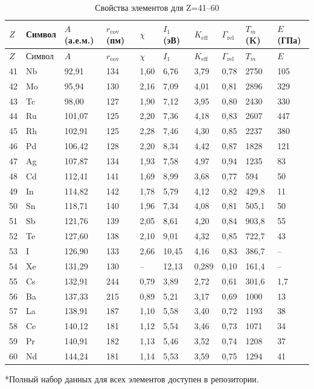 \documentclass[12pt,a4paper]{article}
\newcommand{\Keff}{K_{\mathrm{eff}}}
\begin{document}
	\begin{longtable}{p{0.6cm}p{1.2cm}p{1.2cm}p{1.2cm}p{1.2cm}p{1.2cm}p{1.5cm}p{1.2cm}p{1.2cm}p{1.2cm}}
		\caption{Свойства элементов для Z=41–60} \label{tab:elem-data-41to60} \\
		\toprule
		\(Z\) & Символ & \(A\) (а.е.м.) & \(r_{\text{cov}}\) (пм) & \(\chi\) & \(I_1\) (эВ) & \(\Keff\) & \(\Gamma_{\text{rel}}\) & \(T_m\) (K) & \(E\) (ГПа) \\
		\midrule
		\endfirsthead
		\toprule
		\(Z\) & Символ & \(A\) & \(r_{\text{cov}}\) & \(\chi\) & \(I_1\) & \(\Keff\) & \(\Gamma_{\text{rel}}\) & \(T_m\) & \(E\) \\
		\midrule
		\endhead
		41 & Nb & 92,91 & 134 & 1,60 & 6,76 & 3,79 & 0,78 & 2750 & 105 \\
		42 & Mo & 95,94 & 130 & 2,16 & 7,09 & 4,01 & 0,81 & 2896 & 329 \\
		43 & Tc & 98,00 & 127 & 1,90 & 7,12 & 3,95 & 0,80 & 2430 & 330 \\
		44 & Ru & 101,07 & 125 & 2,20 & 7,36 & 4,18 & 0,83 & 2607 & 447 \\
		45 & Rh & 102,91 & 125 & 2,28 & 7,46 & 4,30 & 0,85 & 2237 & 380 \\
		46 & Pd & 106,42 & 128 & 2,20 & 8,34 & 4,42 & 0,87 & 1828 & 121 \\
		47 & Ag & 107,87 & 134 & 1,93 & 7,58 & 4,97 & 0,94 & 1235 & 83 \\
		48 & Cd & 112,41 & 141 & 1,69 & 8,99 & 3,68 & 0,77 & 594 & 50 \\
		49 & In & 114,82 & 142 & 1,78 & 5,79 & 4,12 & 0,82 & 429,8 & 11 \\
		50 & Sn & 118,71 & 140 & 1,96 & 7,34 & 4,08 & 0,81 & 505,1 & 50 \\
		51 & Sb & 121,76 & 139 & 2,05 & 8,61 & 4,20 & 0,84 & 903,8 & 55 \\
		52 & Te & 127,60 & 138 & 2,10 & 9,01 & 4,32 & 0,85 & 722,7 & 43 \\
		53 & I  & 126,90 & 133 & 2,66 & 10,45 & 4,16 & 0,83 & 386,7 & – \\
		54 & Xe & 131,29 & 130 & –    & 12,13 & 0,289 & 0,10 & 161,4 & – \\
		55 & Cs & 132,91 & 244 & 0,79 & 3,89 & 2,72 & 0,61 & 301,6 & 1,7 \\
		56 & Ba & 137,33 & 215 & 0,89 & 5,21 & 3,17 & 0,69 & 1000 & 13 \\
		57 & La & 138,91 & 187 & 1,10 & 5,58 & 3,40 & 0,72 & 1193 & 38 \\
		58 & Ce & 140,12 & 181 & 1,12 & 5,54 & 3,46 & 0,73 & 1071 & 34 \\
		59 & Pr & 140,91 & 182 & 1,13 & 5,46 & 3,52 & 0,74 & 1208 & 37 \\
		60 & Nd & 144,24 & 181 & 1,14 & 5,53 & 3,59 & 0,75 & 1294 & 41 \\
		\bottomrule
	\end{longtable}
	*Полный набор данных для всех элементов доступен в репозитории.
	
\end{document}
